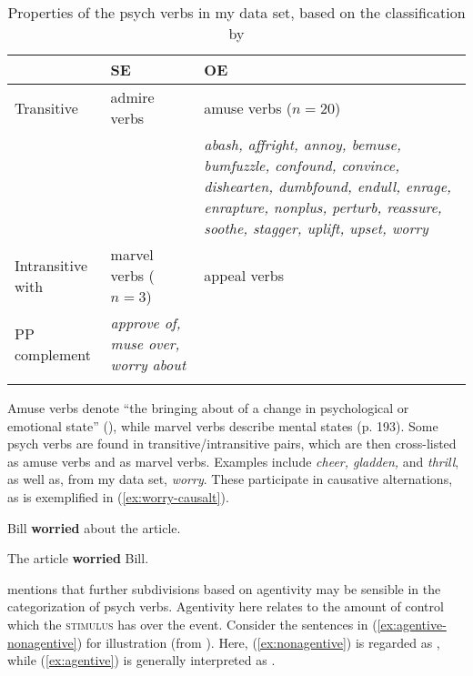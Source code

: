 \begin{table} 
    \caption[Properties of the psych verbs in my data set]{\label{tab:psych-data} Properties of the psych verbs in my data set, based on the classification by \citet[188--193]{Levin.1993}} 
    \begin{tabular}{
        >{\RaggedRight\arraybackslash}p{}
        >{\RaggedRight\arraybackslash}p{}
        >{\RaggedRight\arraybackslash}p{}
      }
      \lsptoprule
      & SE
      & OE \\ 
      \midrule
      Transitive 
      & admire verbs 
      & amuse verbs ($n=20$) \\ 
      && \textit{abash, affright, annoy, bemuse, bumfuzzle, confound, convince, dishearten, dumbfound, endull, enrage, enrapture, nonplus, perturb, reassure, soothe, stagger, uplift, upset, worry} \\ 
      \addlinespace
      Intransitive with 
      & marvel verbs ($n=3$) 
      & appeal verbs \\
      PP complement & \textit{approve of, muse over, worry about} &\\
      \lspbottomrule
    \end{tabular}
\end{table}

Amuse verbs denote ``the bringing about of a change in psychological or emotional state'' (\citealt[191]{Levin.1993}), while marvel verbs describe mental states (p. 193). 
Some psych verbs are found in transitive/intransitive pairs, which are then cross-listed as amuse verbs and as marvel verbs. Examples include \textit{cheer, gladden,} and \textit{thrill}, as well as, from my data set, \textit{worry}. These participate in causative alternations, as is exemplified in (\ref{ex:worry-causalt}). 

\begin{exe}
  \ex \label{ex:worry-causalt}
  \begin{xlist}
    \item Bill \textbf{worried} about the article. 
    \item The article \textbf{worried} Bill. 
  \end{xlist}
\end{exe}

\noindent \citet[191]{Levin.1993} mentions that further subdivisions based on agentivity may be sensible in the categorization of psych verbs. Agentivity here relates to the amount of control which the \textsc{stimulus} has over the event. Consider the sentences in (\ref{ex:agentive-nonagentive}) for illustration (from \citealt[11]{DiDesidero.1993}). Here, (\ref{ex:nonagentive}) is regarded as , while (\ref{ex:agentive}) is generally interpreted as .

